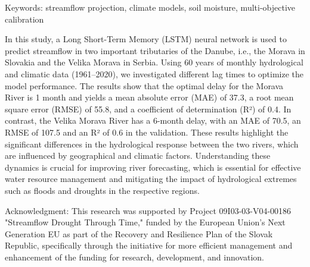 Keywords: streamflow projection, climate models, soil moisture, multi-objective calibration
\newpage{}
{}
\begin{flushleft}





\end{flushleft}

\noindent

In this study, a Long Short-Term Memory (LSTM) neural network is used to predict streamflow in two important tributaries of the Danube, i.e., the Morava in Slovakia and the Velika Morava in Serbia. Using 60 years of monthly hydrological and climatic data (1961–2020), we investigated different lag times to optimize the model performance. The results show that the optimal delay for the Morava River is 1 month and yields a mean absolute error (MAE) of 37.3, a root mean square error (RMSE) of 55.8, and a coefficient of determination (R²) of 0.4. In contrast, the Velika Morava River has a 6-month delay, with an MAE of 70.5, an RMSE of 107.5 and an R² of 0.6 in the validation. These results highlight the significant differences in the hydrological response between the two rivers, which are influenced by geographical and climatic factors. Understanding these dynamics is crucial for improving river forecasting, which is essential for effective water resource management and mitigating the impact of hydrological extremes such as floods and droughts in the respective regions.

Acknowledgment: This research was supported by Project 09I03-03-V04-00186 "Streamflow Drought Through Time," funded by the European Union's Next Generation EU as part of the Recovery and Resilience Plan of the Slovak Republic, specifically through the initiative for more efficient management and enhancement of the funding for research, development, and innovation.

